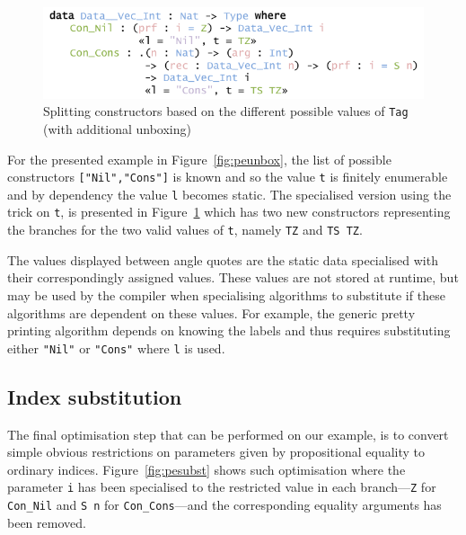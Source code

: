 \documentclass{ituthesis}
\newcommand{\ttconstructor}[1]{\textcolor{constructor-color}{\texttt{#1}}}
\newcommand{\tttype}[1]{\textcolor{type-color}{\texttt{#1}}}
\newcommand{\ttvar}[1]{\textcolor{local-var-color}{\texttt{#1}}}
\newcommand{\ttliteral}[1]{\textcolor{literal-color}{\texttt{#1}}}
\theoremstyle{break}
\begin{document}
\begin{figure}[ht]
\begin{center}
    \includegraphics[scale=0.5]{Figures/PETrick.png}
\end{center}
\caption{Splitting constructors based on the different possible values of \tttype{Tag} (with additional unboxing)}
\label{fig:petr}
\end{figure}

For the presented example in Figure~\ref{fig:peunbox}, the list of possible constructors  \ttconstructor{[}\ttliteral{"Nil"}\ttconstructor{,}\ttliteral{"Cons"}\ttconstructor{]} is known and so the value \ttvar{t} is finitely enumerable and by dependency the value \ttvar{l} becomes static.
The specialised version using the trick on \ttvar{t}, is presented in Figure~\ref{fig:petr} which has two new constructors representing the branches for the two valid values of \ttvar{t}, namely \ttconstructor{TZ} and \ttconstructor{TS TZ}.

The values displayed between angle quotes are the static data specialised with their correspondingly assigned values.
These values are not stored at runtime, but may be used by the compiler when specialising algorithms to substitute if these algorithms are dependent on these values.
For example, the generic pretty printing algorithm depends on knowing the labels and thus requires substituting either \ttliteral{"Nil"} or \ttliteral{"Cons"} where \ttvar{l} is used.

\subsection{Index substitution}
\label{sub:Index substitution}
The final optimisation step that can be performed on our example, is to convert simple obvious restrictions on parameters given by propositional equality to ordinary indices.
Figure~\ref{fig:pesubst} shows such optimisation where the parameter \ttvar{i} has been specialised to the restricted value in each branch---\ttconstructor{Z} for \ttconstructor{Con\_Nil} and \ttconstructor{S}~\ttvar{n} for \ttconstructor{Con\_Cons}---and the corresponding equality arguments has been removed.
\end{document}
